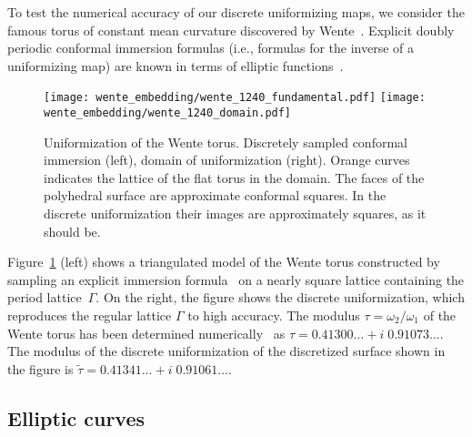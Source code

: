 \documentclass[Thesis]{subfiles}
\begin{document}
To test the numerical accuracy of our discrete uniformizing maps, we
consider the famous torus of constant mean curvature discovered by
Wente~\cite{wente1986}. Explicit doubly periodic conformal immersion
formulas (i.e., formulas for the inverse of a uniformizing map) are
known in terms of elliptic functions~\cite{abresch1987, walter1989, bobenko1991}. 

\begin{figure}
\centering
\texttt{[image: wente\_embedding/wente\_1240\_fundamental.pdf]}\hfill
\texttt{[image: wente\_embedding/wente\_1240\_domain.pdf]}
\caption{Uniformization of the Wente torus. Discretely sampled conformal immersion (left), domain of uniformization (right). Orange curves indicates the lattice of the flat torus in the domain. The faces of the polyhedral surface are approximate conformal squares. In the discrete uniformization their images are approximately squares, as it should be.}
\label{fig:wente_torus_embedded}
\end{figure}

Figure~\ref{fig:wente_torus_embedded} (left) shows a triangulated model 
of the Wente torus constructed by sampling
an explicit immersion formula~\cite{bobenko1991} on a nearly square
lattice containing the period lattice~$\Gamma$. On the right, the
figure shows the discrete uniformization, which reproduces the regular
lattice $\Gamma$ to high accuracy. The modulus
$\tau=\omega_{2}/\omega_{1}$ of the Wente torus has been determined
numerically~\cite{Heil95} as $\tau =
0.41300\ldots+i\;0.91073\ldots$\;. The modulus of the discrete
uniformization of the discretized surface shown in the figure is
$\tilde \tau = 0.41341\ldots + i\;0.91061\ldots$\;.


\subsection{Elliptic curves}
\label{sec:elliptic_curves}
\end{document}
